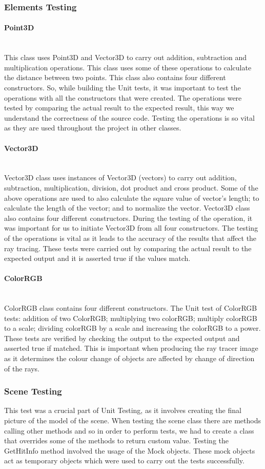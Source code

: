 \documentclass[a4paper]{report}
\newcommand{
	\subsubsubsection}[1]
{\paragraph{#1}\mbox{}\\[.35em]}
\begin{document}
	\subsubsection{Elements Testing}
	\subsubsubsection{Point3D}
	This class uses Point3D and Vector3D to carry out addition, subtraction and multiplication operations. This class uses some of these operations to calculate the distance between two points. This class also contains four different constructors. So, while building the Unit tests, it was important to test the operations with all the constructors that were created. The operations were tested by comparing the actual result to the expected result, this way we understand the correctness of the source code. Testing the operations is so vital as they are used throughout the project in other classes.
	\subsubsubsection{Vector3D}
	Vector3D class uses instances of Vector3D (vectors) to carry out addition, subtraction, multiplication, division, dot product and cross product. Some of the above operations are used to also calculate the square value of vector’s length; to calculate the length of the vector; and to normalize the vector. Vector3D class also contains four different constructors. During the testing of the operation, it was important for us to initiate Vector3D from all four constructors. The testing of the operations is vital as it leads to the accuracy of the results that affect the ray tracing. These tests were carried out by comparing the actual result to the expected output and it is asserted true if the values match.
	\subsubsubsection{ColorRGB}
	ColorRGB class contains four different constructors. The Unit test of ColorRGB tests: addition of two ColorRGB; multiplying two colorRGB; multiply colorRGB to a scale; dividing colorRGB by a scale and increasing the colorRGB to a power. These tests are verified by checking the output to the expected output and asserted true if matched. This is important when producing the ray tracer image as it determines the colour change of objects are affected by change of direction of the rays.
	\subsubsection{Scene Testing}
	This test was a crucial part of Unit Testing, as it involves creating the final picture of the model of the scene. When testing the scene class there are methods calling other methods and so in order to perform tests, we had to create a class that overrides some of the methods to return custom value. Testing the GetHitInfo method involved the usage of the Mock objects. These mock objects act as temporary objects which were used to carry out the tests successfully. 
\end{document}

